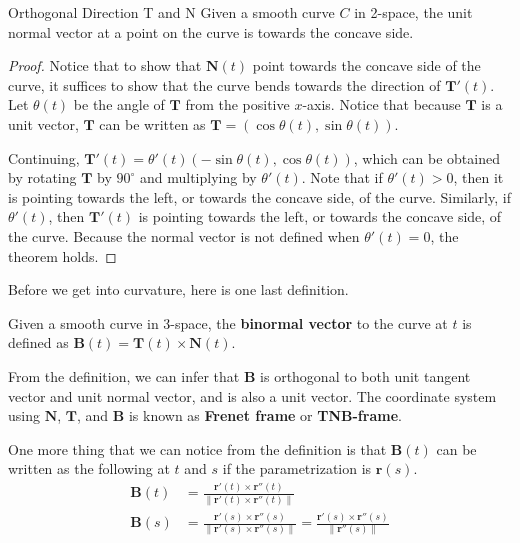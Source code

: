 \documentclass[../../../main.tex]{subfiles}
\begin{document}
\begin{theorem}{}{Orthogonal Direction T and N}
Given a smooth curve $C$ in 2-space, the unit normal vector at a point
on the curve is towards the concave side.
\end{theorem}
\begin{proof}
Notice that to show that $\mathbf{N}(t)$ point towards the concave
side of the curve, it suffices to show that the curve bends towards
the direction of $\mathbf{T}'(t)$. Let $\theta(t)$ be the angle
of $\mathbf{T}$ from the positive $x$-axis. Notice that because
$\mathbf{T}$ is a unit vector, $\mathbf{T}$ can be written as
$\mathbf{T} = (\cos\theta(t), \sin\theta(t))$.

Continuing, $\mathbf{T}'(t) = \theta'(t)(-\sin\theta(t),
\cos\theta(t))$, which can be obtained by rotating $\mathbf{T}$ by
$90^\circ$ and multiplying by $\theta'(t)$. Note that if $\theta'(t)
> 0$, then it is pointing towards the left, or towards the concave
side, of the curve. Similarly, if $\theta'(t)$, then $\mathbf{T}'(t)$
is pointing towards the left, or towards the concave side, of the
curve. Because the normal vector is not defined when $\theta'(t) = 0$,
the theorem holds.
\end{proof}

Before we get into curvature, here is one last definition.

\begin{definition}{}{}
Given a smooth curve in 3-space, the \textbf{binormal vector} to
the curve at $t$ is defined as $\mathbf{B}(t) = \mathbf{T}(t) \times
\mathbf{N}(t)$.
\end{definition}

From the definition, we can infer that $\mathbf{B}$ is orthogonal
to both unit tangent vector and unit normal vector, and is also a
unit vector. The coordinate system using $\mathbf{N}$, $\mathbf{T}$,
and $\mathbf{B}$ is known as \textbf{Frenet frame} or
\textbf{TNB-frame}.

\begin{important}
One more thing that we can notice from the definition is that
$\mathbf{B}(t)$ can be written as the following at $t$ and $s$
if the parametrization is $\mathbf{r}(s)$.
\begin{align*}
    \mathbf{B}(t)
    &= \frac{\mathbf{r}'(t) \times \mathbf{r}''(t)}
        {\| \mathbf{r}'(t) \times \mathbf{r}''(t) \|} \\
    \mathbf{B}(s)
    &= \frac{\mathbf{r}'(s) \times \mathbf{r}''(s)}
        {\| \mathbf{r}'(s) \times \mathbf{r}''(s) \|}
    = \frac{\mathbf{r}'(s) \times \mathbf{r}''(s)}
        {\| \mathbf{r}''(s) \|}
\end{align*}
\end{important}
\end{document}
